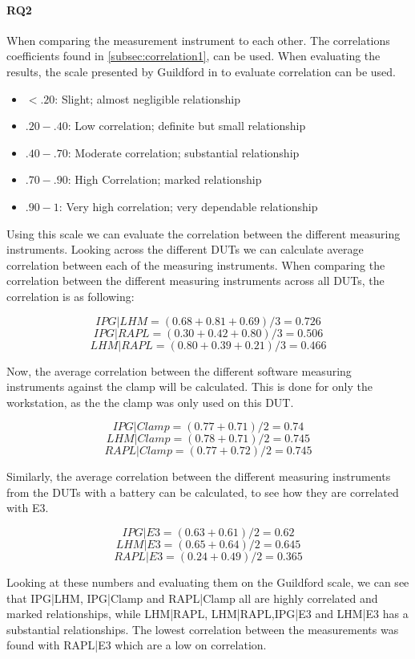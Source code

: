 \paragraph{RQ2}
When comparing the measurement instrument to each other.
The correlations coefficients found in \cref{subsec:correlation1}, can be used. When evaluating the results, the scale presented by Guildford in \cite[219]{guilford1950fundamental} to evaluate correlation can be used. 
\begin{itemize}
    \item $<.20$: Slight; almost negligible relationship
    \item $.20-.40$: Low correlation; definite but small relationship
    \item $.40-.70$: Moderate correlation; substantial relationship
    \item $.70-.90$: High Correlation; marked relationship
    \item $.90-1$: Very high correlation; very dependable relationship
\end{itemize}
Using this scale we can evaluate the correlation between the different measuring instruments. Looking across the different DUTs we can calculate average correlation between each of the measuring instruments. When comparing the correlation between the different measuring instruments across all DUTs, the correlation is as following:

$$IPG|LHM = (0.68+0.81+0.69)/3 = 0.726$$
$$IPG|RAPL = (0.30+0.42+0.80)/3 = 0.506$$
$$LHM|RAPL = (0.80+0.39+0.21)/3 = 0.466$$

Now, the average correlation between the different software measuring instruments against the clamp will be calculated. This is done for only the workstation, as the the clamp was only used on this DUT.

$$IPG|Clamp = (0.77+0.71)/2 = 0.74$$
$$LHM|Clamp = (0.78+0.71)/2 = 0.745$$
$$RAPL|Clamp = (0.77+0.72)/2 = 0.745$$

Similarly, the average correlation between the different measuring instruments from the DUTs with a battery can be calculated, to see how they are correlated with E3.

$$IPG|E3 = (0.63+0.61)/2 = 0.62$$
$$LHM|E3 = (0.65+0.64)/2 = 0.645$$
$$RAPL|E3 = (0.24+0.49)/2 = 0.365$$

Looking at these numbers and evaluating them on the Guildford scale, we can see that IPG|LHM, IPG|Clamp and RAPL|Clamp all are highly correlated and marked relationships, while LHM|RAPL, LHM|RAPL,IPG|E3 and LHM|E3 has a substantial relationships. The lowest correlation between the measurements was found with RAPL|E3 which are a low on correlation.
